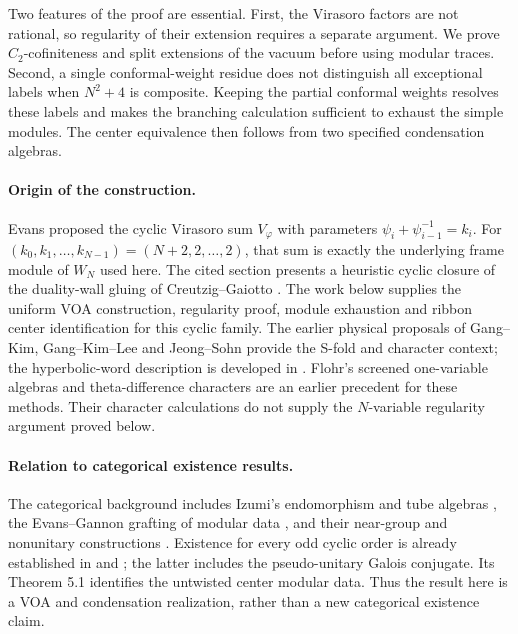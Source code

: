 \documentclass[11pt,a4paper]{article}
\numberwithin{equation}{section}
\theoremstyle{definition}\newtheorem{definition}[theorem]{Definition}
\theoremstyle{remark}\newtheorem{remark}[theorem]{Remark}
\begin{document}
Two features of the proof are essential. First, the Virasoro factors
are not rational, so regularity of their extension requires a separate
argument. We prove $C_2$-cofiniteness and split extensions of the
vacuum before using modular traces. Second, a single conformal-weight residue does not distinguish
all exceptional labels when $N^2+4$ is composite. Keeping the partial conformal weights resolves these
labels and makes the branching calculation sufficient to exhaust
the simple modules. The center equivalence then follows from two
specified condensation algebras.

\paragraph{Origin of the construction.}
Evans \cite[Section 6.2]{evanssfold} proposed the cyclic Virasoro sum
$V_\varphi$ with parameters $\psi_i+\psi_{i-1}^{-1}=k_i$.
For $(k_0,k_1,\ldots,k_{N-1})=(N+2,2,\ldots,2)$, that sum is exactly
the underlying frame module of $W_N$ used here. The cited section
presents a heuristic cyclic closure of the duality-wall gluing of
Creutzig--Gaiotto \cite{cgduality}. The work below supplies the uniform
VOA construction, regularity proof, module exhaustion and ribbon
center identification for this cyclic family. The earlier physical
proposals of Gang--Kim, Gang--Kim--Lee and Jeong--Sohn
\cite{gangkim,gangkimlee,jeongsohn} provide the S-fold and character
context; the hyperbolic-word description is developed in
\cite{evanswords}. Flohr's screened one-variable algebras and theta-difference
characters \cite{flohr1993,flohr1994} are an earlier precedent for
these methods. Their character calculations do not supply the
$N$-variable regularity argument proved below.

\paragraph{Relation to categorical existence results.}
The categorical background includes Izumi's endomorphism and tube
algebras \cite{izumi}, the Evans--Gannon grafting of modular data
\cite[Section 3.3]{evansgannon2011}, and their near-group and
nonunitary constructions \cite{evansgannon2014,evansgannon2017}.
Existence for every odd cyclic order is already established in
\cite{huangcyclic} and \cite[Theorem A(1)]{gsy}; the latter includes
the pseudo-unitary Galois conjugate. Its Theorem 5.1 identifies the
untwisted center modular data. Thus the result here is a VOA and
condensation realization, rather than a new categorical existence
claim.
\end{document}
